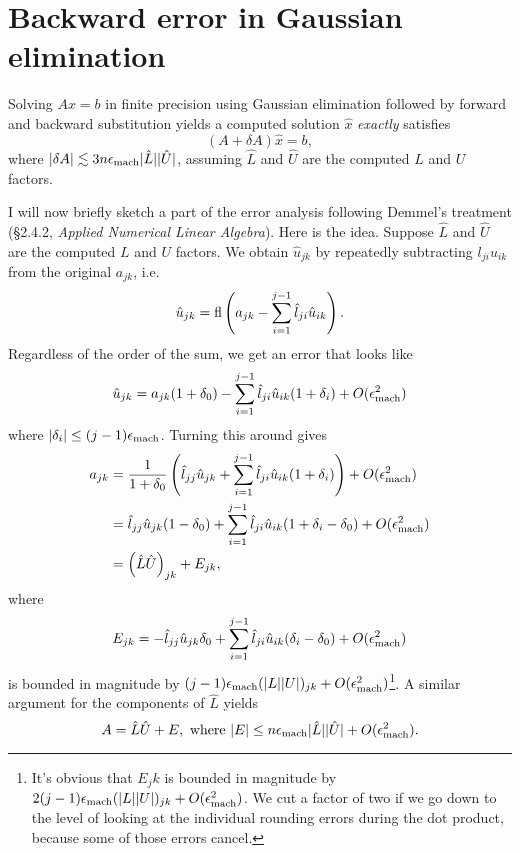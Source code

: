\documentclass[12pt, leqno]{article}
\begin{document}

\section*{Backward error in Gaussian elimination}

Solving $Ax = b$ in finite precision using Gaussian elimination
followed by forward and backward substitution yields a computed
solution $\hat{x}$ {\em exactly} satisfies
\begin{equation} \label{gauss-bnd}
  (A + \delta A) \hat{x} = b,
\end{equation}
where $|\delta A| \lesssim 3n\epsilon_{\mathrm{mach}} |\hat{L}| |\hat{U}|$, assuming
$\hat{L}$ and $\hat{U}$ are the computed $L$ and $U$ factors.

I will now briefly sketch a part of the error analysis following
Demmel's treatment (\S 2.4.2, {\em Applied Numerical Linear Algebra}).
Here is the idea.  Suppose $\hat{L}$ and $\hat{U}$ are the computed
$L$ and $U$ factors.  We obtain $\hat{u}_{jk}$ by repeatedly
subtracting $l_{ji} u_{ik}$ from the original $a_{jk}$, i.e.
\[
  \hat{u}_{jk} = 
    \operatorname{fl}\left( a_{jk} - \sum_{i=1}^{j-1} \hat{l}_{ji} \hat{u}_{ik} \right).
\]
Regardless of the order of the sum, we get an error that looks like
\[
  \hat{u}_{jk} = a_{jk}(1+\delta_0) - 
                 \sum_{i=1}^{j-1} \hat{l}_{ji} \hat{u}_{ik} (1+\delta_i) + 
                 O(\epsilon_{\mathrm{mach}}^2)
\]
where $|\delta_i| \leq (j-1) \epsilon_{\mathrm{mach}}$.  Turning this around gives
\begin{align*}
  a_{jk} & = 
  \frac{1}{1+\delta_0} \left( 
    \hat{l}_{jj} \hat{u}_{jk} + 
    \sum_{i=1}^{j-1} \hat{l}_{ji} \hat{u}_{ik} (1 + \delta_i) 
  \right) + O(\epsilon_{\mathrm{mach}}^2) \\
  & = 
    \hat{l}_{jj} \hat{u}_{jk} (1 - \delta_0) + 
    \sum_{i=1}^{j-1} \hat{l}_{ji} \hat{u}_{ik} (1 + \delta_i - \delta_0) +
    O(\epsilon_{\mathrm{mach}}^2) \\
  & = 
    \left( \hat{L} \hat{U} \right)_{jk} + E_{jk},
\end{align*}
where
\[
   E_{jk} =
    -\hat{l}_{jj} \hat{u}_{jk} \delta_0 + 
    \sum_{i=1}^{j-1} \hat{l}_{ji} \hat{u}_{ik} (\delta_i - \delta_0) +
    O(\epsilon_{\mathrm{mach}}^2)
\]
is bounded in magnitude by $(j-1) \epsilon_{\mathrm{mach}} (|L||U|)_{jk} + O(\epsilon_{\mathrm{mach}}^2)$\footnote{
  It's obvious that $E_jk$ is bounded in magnitude by $2(j-1)
  \epsilon_{\mathrm{mach}}(|L||U|)_{jk} + O(\epsilon_{\mathrm{mach}}^2)$.  We cut a factor of two if
  we go down to the level of looking at the individual rounding errors
  during the dot product, because some of those errors cancel.
}.
A similar argument for the components of $\hat{L}$ yields
\[
  A = \hat{L} \hat{U} + E, \mbox{ where } 
  |E| \leq n \epsilon_{\mathrm{mach}} |\hat{L}| |\hat{U}| + O(\epsilon_{\mathrm{mach}}^2).
\]
\end{document}
